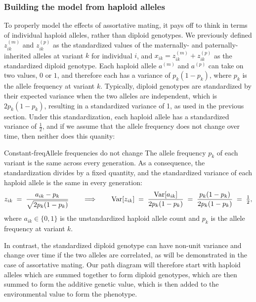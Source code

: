 \documentclass[12pt]{article}
\begin{document}
\subsubsection*{Building the model from haploid alleles}
To properly model the effects of assortative mating, it pays off to think in terms of individual haploid alleles, rather than diploid genotypes.
We previously defined $z_{ik}^{(m)}$ and $z_{ik}^{(p)}$ as the standardized values of the maternally- and paternally-inherited alleles at variant $k$ for individual $i$, and $x_{ik} = z_{ik}^{(m)} + z_{ik}^{(p)}$ as the standardized diploid genotype.
Each haploid allele $a^{(m)}$ and $a^{(p)}$ can take on two values, $0$ or $1$, and therefore each has a variance of $p_k(1-p_k)$, where $p_k$ is the allele frequency at variant $k$.
Typically, diploid genotypes are standardized by their expected variance when the two alleles are independent, which is $2p_k(1-p_k)$, resulting in a standardized variance of 1, as used in the previous section.
Under this standardization, each haploid allele has a standardized variance of $\tfrac12$, and if we assume that the allele frequency does not change over time, then neither does this quanity:

\begin{assumption}{Constant-freq}{Allele frequencies do not change}
The allele frequency $p_k$ of each variant is the same across every generation.
As a consequence, the standardization divides by a fixed quantity, and the standardized variance of each haploid allele is the same in every generation:
$$
    z_{ik} \;=\; \frac{a_{ik} - p_k}{\sqrt{2p_k(1-p_k)}}
    \qquad\Longrightarrow\qquad
    \mathrm{Var}[z_{ik}] \;=\; \frac{\mathrm{Var}[a_{ik}]}{2p_k(1-p_k)} \;=\; \frac{p_k(1-p_k)}{2p_k(1-p_k)} \;=\; \tfrac12 ,
$$
where $a_{ik} \in \{0,1\}$ is the unstandardized haploid allele count and $p_k$ is the allele frequency at variant $k$.
\end{assumption}

In contrast, the standardized diploid genotype can have non-unit variance and change over time if the two alleles are correlated, as will be demonstrated in the case of assortative mating.
Our path diagram will therefore start with haploid alleles which are summed together to form diploid genotypes, which are then summed to form the additive genetic value, which is then added to the environmental value to form the phenotype.
\end{document}
